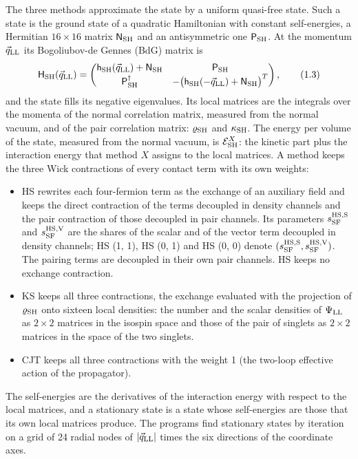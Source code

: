 \documentclass[
  10pt,
]{article}
\providecommand{\tightlist}{%
  \setlength{\itemsep}{0pt}\setlength{\parskip}{0pt}}
\begin{document}
The three methods approximate the state by a uniform quasi-free state.
Such a state is the ground state of a quadratic Hamiltonian with
constant self-energies, a Hermitian \(16\times16\) matrix
\(\mathsf N_{\rm SH}\) and an antisymmetric one \(\mathsf P_{\rm SH}\).
At the momentum \(\vec q_{\rm LL}\) its Bogoliubov-de Gennes (BdG)
matrix is
\[\mathsf H_{\rm SH}(\vec q_{\rm LL})=\begin{pmatrix}\mathsf h_{\rm SH}(\vec q_{\rm LL})+\mathsf N_{\rm SH}&\mathsf P_{\rm SH}\\\mathsf P_{\rm SH}^\dagger&-\big(\mathsf h_{\rm SH}(-\vec q_{\rm LL})+\mathsf N_{\rm SH}\big)^T\end{pmatrix},\tag{1.3}\]
and the state fills its negative eigenvalues. Its local matrices are the
integrals over the momenta of the normal correlation matrix, measured
from the normal vacuum, and of the pair correlation matrix:
\(\varrho_{\rm SH}\) and \(\kappa_{\rm SH}\). The energy per volume of
the state, measured from the normal vacuum, is
\(\mathcal E^X_{\rm SH}\): the kinetic part plus the interaction energy
that method \(X\) assigns to the local matrices. A method keeps the
three Wick contractions of every contact term with its own weights:

\begin{itemize}
\tightlist
\item
  HS rewrites each four-fermion term as the exchange of an auxiliary
  field and keeps the direct contraction of the terms decoupled in
  density channels and the pair contraction of those decoupled in pair
  channels. Its parameters \(s^{\rm HS,S}_{\rm SF}\) and
  \(s^{\rm HS,V}_{\rm SF}\) are the shares of the scalar and of the
  vector term decoupled in density channels; HS (1, 1), HS (0, 1) and HS
  (0, 0) denote \((s^{\rm HS,S}_{\rm SF},s^{\rm HS,V}_{\rm SF})\). The
  pairing terms are decoupled in their own pair channels. HS keeps no
  exchange contraction.
\item
  KS keeps all three contractions, the exchange evaluated with the
  projection of \(\varrho_{\rm SH}\) onto sixteen local densities: the
  number and the scalar densities of \(\Psi_{\rm LL}\) as \(2\times2\)
  matrices in the isospin space and those of the pair of singlets as
  \(2\times2\) matrices in the space of the two singlets.
\item
  CJT keeps all three contractions with the weight 1 (the two-loop
  effective action of the propagator).
\end{itemize}

The self-energies are the derivatives of the interaction energy with
respect to the local matrices, and a stationary state is a state whose
self-energies are those that its own local matrices produce. The
programs find stationary states by iteration on a grid of 24 radial
nodes of \(\lvert\vec q_{\rm LL}\rvert\) times the six directions of the
coordinate axes.
\end{document}
